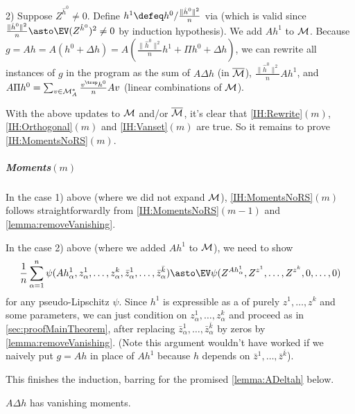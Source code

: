 \documentclass[main.tex]{subfiles}
\begin{document}
2) Suppose $Z^{\hat{h}^{0}}\ne0$. Define $h^{1}\defeq h^{0}/\frac{\|\hat{h}^{0}\|^{2}}{n}$ via  (which is valid since $\frac{\|\hat{h}^{0}\|^{2}}{n}\asto\EV(Z^{\hat{h}^{0}})^{2}\ne0$ by induction hypothesis). We add $Ah^{1}$ to $\mathcal{M}$. Because $g=Ah=A(h^{0}+\Delta h)=A(\frac{\|\hat{h}^{0}\|^{2}}{n}h^{1}+\Pi h^{0}+\Delta h)$, we can rewrite all instances of $g$ in the program as the sum of $A\Delta h$ (in $\overline{\mathcal{M}}$), $\frac{\|\hat{h}^{0}\|^{2}}{n}Ah^{1}$, and $A\Pi h^{0}=\sum_{v\in\coreset_{A}^{*}}\frac{v^{\trsp}h^{0}}{n}Av$ (linear combinations of $\mathcal{M}$).

With the above updates to $\mathcal{M}$ and/or $\overline{\mathcal{M}}$, it's clear that \ref{IH:Rewrite}$(m)$, \ref{IH:Orthogonal}$(m)$ and \ref{IH:Vanset}$(m)$ are true. So it remains to prove \ref{IH:MomentsNoRS}$(m)$.

\subparagraph*{Moments$(m)$}

In the case 1) above (where we did not expand $\mathcal{M}$), \ref{IH:MomentsNoRS}$(m)$ follows straightforwardly from \ref{IH:MomentsNoRS}$(m-1)$ and \cref{lemma:removeVanishing}.

In the case 2) above (where we added $Ah^{1}$ to $\mathcal{M}$), we need to show
\[
\frac{1}{n}\sum_{\alpha=1}^{n}\psi(Ah_{\alpha}^{1},z_{\alpha}^{1},\ldots,z_{\alpha}^{k},\bar{z}_{\alpha}^{1},\ldots,\bar{z}_{\alpha}^{\bar{k}})\asto\EV\psi(Z^{Ah_{\alpha}^{1}},Z^{z^{1}},\ldots,Z^{z^{k}},0,\ldots,0)
\]
for any pseudo-Lipschitz $\psi$. Since $h^{1}$ is expressible as a  of purely $z^{1},\ldots,z^{k}$ and some parameters, we can just condition on $z_{\alpha}^{1},\ldots,z_{\alpha}^{k}$ and proceed as in \cref{sec:proofMainTheorem}, after replacing $\bar{z}_{\alpha}^{1},\ldots,\bar{z}_{\alpha}^{\bar{k}}$ by zeros by \cref{lemma:removeVanishing}. (Note this argument wouldn't have worked if we naively put $g=Ah$ in place of $Ah^{1}$ because $h$ depends on $\bar{z}^{1},\ldots,\bar{z}^{\bar{k}}$).

This finishes the induction, barring for the promised \cref{lemma:ADeltah} below.

\begin{lemma}
\label{lemma:ADeltah}$A\Delta h$ has vanishing moments.
\end{lemma}
\end{document}
